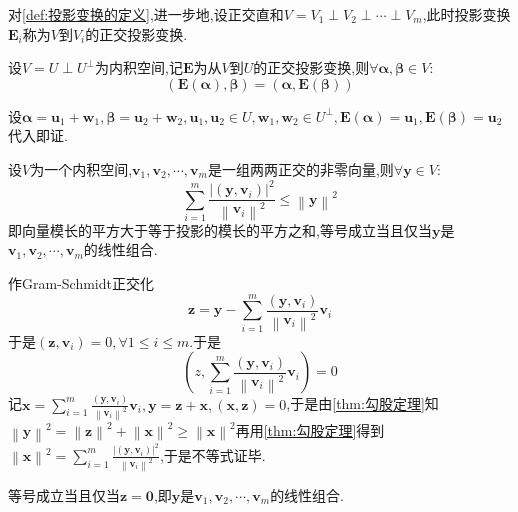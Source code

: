\begin{formal}
    \begin{definition}[正交投影变换的定义]\label{def:正交投影变换的定义}
        对\cref{def:投影变换的定义},进一步地,设正交直和$V=V_1\perp V_2\perp\cdots\perp V_m$,此时投影变换$\bm{E}_i$称为$V$到$V_i$的正交投影变换.
    \end{definition}
\end{formal}
\begin{green}
    \begin{lemma}[正交投影变换的对称性]\label{lem:正交投影变换的对称性}
        设$V=U\perp U^{\perp}$为内积空间,记$\bm{E}$为从$V$到$U$的正交投影变换,则$\forall\bm{\alpha},\bm{\beta}\in V:$\[
        \left(
            \bm{E}\left(\bm{\alpha}\right),\bm{\beta}
        \right)=\left(
            \bm{\alpha},\bm{E}\left(\bm{\beta}\right)
        \right)
        \]
    \end{lemma}
    \begin{Proof}
        设$\bm{\alpha}=\bm{u}_1+\bm{w}_1,\bm{\beta}=\bm{u}_2+\bm{w}_2,\bm{u}_1,\bm{u}_2\in U,\bm{w}_1,\bm{w}_2\in U^{\perp},\bm{E}\left(\bm{\alpha}\right)=\bm{u}_1,\bm{E}\left(\bm{\beta}\right)=\bm{u}_2$代入即证.
    \end{Proof}
\end{green}
\begin{formal}
    \begin{theorem}[Bessel不等式]\label{thm:Bessel不等式}
        设$V$为一个内积空间,$\bm{v}_1,\bm{v}_2,\cdots,\bm{v}_m$是一组两两正交的非零向量,则$\forall\bm{y}\in V:$\[
        \sum_{i=1}^{m}\frac{
            \left|\left(\bm{y},\bm{v}_i\right)\right|^2
        }{\left\lVert \bm{v}_i\right\rVert ^2}\leqslant\left\lVert \bm{y}\right\rVert ^2
        \]即向量模长的平方大于等于投影的模长的平方之和,等号成立当且仅当$\bm{y}$是$
        \bm{v}_1,\bm{v}_2,\cdots,\bm{v}_m
         $的线性组合.
    \end{theorem}
    \begin{Proof}
        作\textup{Gram-Schmidt}正交化\[
        \bm{z}=\bm{y}-\sum_{i=1}^{m}\frac{
            \left(\bm{y},\bm{v}_i\right)
        }{\left\lVert \bm{v}_i\right\rVert ^2}\bm{v}_i
        \]于是$\left(\bm{z},\bm{v}_i\right)=0,\forall1\leqslant i\leqslant m.$于是\[
        \left(
            z,\sum_{i=1}^{m}\frac{
            \left(\bm{y},\bm{v}_i\right)
        }{\left\lVert \bm{v}_i\right\rVert ^2}\bm{v}_i
        \right)=0
        \]记$\displaystyle \bm{x}=\sum_{i=1}^{m}\frac{
            \left(\bm{y},\bm{v}_i\right)
        }{\left\lVert \bm{v}_i\right\rVert ^2}\bm{v}_i,\bm{y}=\bm{z}+\bm{x},\left(\bm{x},\bm{z}\right)=0$,于是由\cref{thm:勾股定理}知$
        \left\lVert \bm{y}\right\rVert ^2=\left\lVert \bm{z}\right\rVert ^2+\left\lVert \bm{x}\right\rVert ^2\geqslant\left\lVert \bm{x}\right\rVert ^2
        $再用\cref{thm:勾股定理}得到$\displaystyle\left\lVert\bm{x}\right\rVert^2=\sum_{i=1}^{m}\frac{\left|\left(\bm{y},\bm{v}_i\right)\right|^2}{
            \left\lVert \bm{v}_i\right\rVert ^2
        }$,于是不等式证毕.

        等号成立当且仅当$\bm{z}=\bm{0}$,即$\bm{y}$是$\bm{v}_1,\bm{v}_2,\cdots,\bm{v}_m$的线性组合.
    \end{Proof}
\end{formal}
